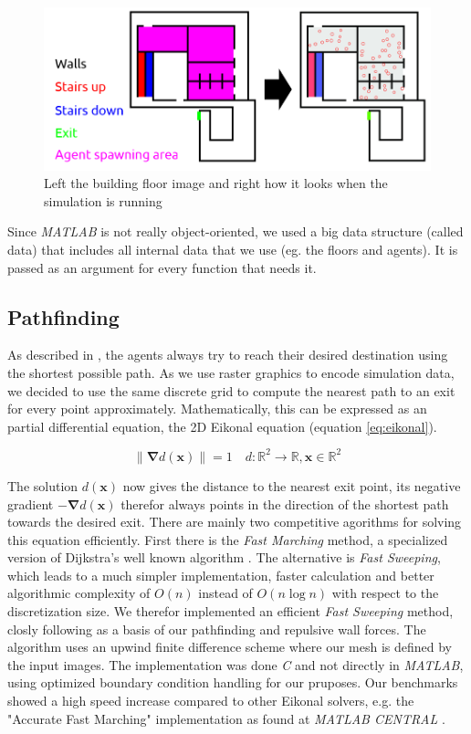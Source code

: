\documentclass[11pt]{article}
\begin{document}
\begin{figure}[h]
\centering
\includegraphics[width=\textwidth]{./images/config_floor_description.png}
\caption{Left the building floor image and right how it looks when the
simulation is running} 
\label{building floor image}
\end{figure}

Since \textit{MATLAB} is not really object-oriented, we used a big data structure (called
data) that includes all internal data that we use (eg. the floors and agents).
It is passed as an argument for every function that needs it.

\subsection{Pathfinding}
As described in \cite{SFMPD}, the agents always try to reach their desired destination
using the shortest possible path. As we use raster graphics to encode simulation data,
we decided to use the same discrete grid to compute the nearest path to an exit for every point approximately.
Mathematically, this can be expressed as an partial differential equation, the 2D Eikonal equation (equation \ref{eq:eikonal}).

\begin{equation} \label{eq:eikonal}
\|\mathbf{\nabla} d(\mathbf{x})\|=1 \quad d:\!\mathbb{R}^{2}\to\mathbb{R},\mathbf{x}\in\mathbb{R}^{2}
\end{equation}

The solution $d(\mathbf{x})$ now gives the distance to the nearest exit point, its
negative gradient $-\mathbf{\nabla}d(\mathbf{x})$ therefor always points in the 
direction of the shortest path towards the desired exit. There are mainly two
competitive agorithms for solving this equation efficiently. First there is the
\textit{Fast Marching} method, a specialized version of Dijkstra's well known 
algorithm \cite{dijkstra59a}. The alternative is \textit{Fast Sweeping}, which 
leads to a much simpler implementation, faster calculation and better algorithmic
complexity of $O(n)$ instead of $O(n\log n)$ with respect to the discretization size.
We therefor implemented an efficient \textit{Fast Sweeping} method, closly following
\cite{Zhao04afast} as a basis of our pathfinding and repulsive wall forces. The 
algorithm uses an upwind finite difference scheme where our mesh is defined by 
the input images. The implementation was done \textit{C} and not directly in
\textit{MATLAB}, using optimized boundary condition handling for our pruposes.
Our benchmarks showed a high speed increase compared to other Eikonal solvers,
e.g. the "Accurate Fast Marching" implementation as found at \textit{MATLAB CENTRAL}
\cite{fastmarching}.
\end{document}
